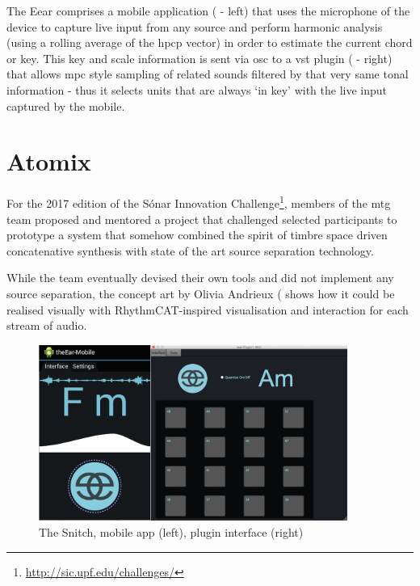 The Eear comprises a mobile application ( - left) that uses the microphone of the device to capture live input from any source and perform harmonic analysis (using a rolling average of the \acrshort{hpcp} vector) in order to estimate the current chord or key. This key and scale information is sent via \acrshort{osc} to a \acrshort{vst} plugin ( - right) that allows \acrshort{mpc} style sampling of related sounds filtered by that very same tonal information - thus it selects units that are always `in key' with the live input captured by the mobile.

\section{Atomix}

For the 2017 edition of the Sónar Innovation Challenge\footnote{\url{http://sic.upf.edu/challenges/}}, members of the \acrshort{mtg} team proposed and mentored a project that challenged selected participants to prototype a system that somehow combined the spirit of timbre space driven concatenative synthesis with state of the art source separation technology.

While the team eventually devised their own tools and did not implement any source separation, the concept art by Olivia Andrieux ( shows how it could be realised visually with RhythmCAT-inspired visualisation and interaction for each stream of audio.

\begin{figure}
	\begin{center}
		\includegraphics[width=0.9\textwidth]{ch99/figures/combined.png}
	\end{center}
	\caption[The Snitch Enhanced DJ Assistant Mobile and Plugin Interface]{The Snitch, mobile app (left), plugin interface (right)}
	\label{fig:eear}
\end{figure}

